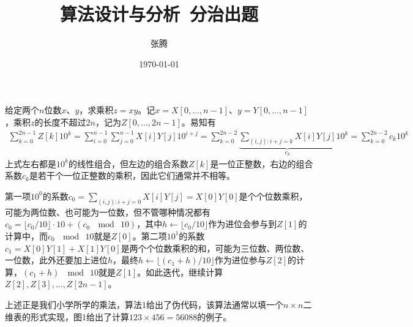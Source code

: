 \documentclass{ctexart}
\begin{document}
\title{算法设计与分析~分治出题}
\author{张腾}
\date{\today}
\maketitle

给定两个$n$位数$x$、$y$，求乘积$z = xy$。记$x = X[0, \ldots, n-1]$、$y = Y[0, \ldots, n-1]$，乘积$z$的长度不超过$2n$，记为$Z[0, \ldots, 2n-1]$。易知有
\begin{align*}
    \sum_{k=0}^{2n-1} Z[k] 10^k = \sum_{i=0}^{n-1} \sum_{j=0}^{n-1} X[i] Y[j] 10^{i+j} = \sum_{k=0}^{2n-2} \underbrace{\sum_{(i,j): i+j=k} X[i] Y[j]}_{c_k} 10^k = \sum_{k=0}^{2n-2} c_k 10^k
\end{align*}
上式左右都是$10^k$的线性组合，但左边的组合系数$Z[k]$是一位正整数，右边的组合系数$c_k$是若干个一位正整数的乘积，因此它们通常并不相等。

第一项$10^0$的系数$c_0 = \sum_{(i,j): i+j=0} X[i] Y[j] = X[0] Y[0]$是个个位数乘积，可能为两位数、也可能为一位数，但不管哪种情况都有$c_0 = \lfloor c_0 / 10 \rfloor \cdot 10 + (c_0 ~ \mod ~ 10)$，其中$h \leftarrow \lfloor c_0 / 10 \rfloor$作为进位会参与到$Z[1]$的计算中，而$c_0 ~ \mod ~ 10$就是$Z[0]$。第二项$10^1$的系数$c_1 = X[0] Y[1] + X[1] Y[0]$是两个个位数乘积的和，可能为三位数、两位数、一位数，此外还要加上进位$h$，最终$h \leftarrow \lfloor (c_1 + h) / 10 \rfloor$作为进位参与$Z[2]$的计算，$(c_1 + h) ~ \mod ~ 10$就是$Z[1]$。如此迭代，继续计算$Z[2], Z[3], \ldots, Z[2n-1]$。

上述正是我们小学所学的乘法，算法1给出了伪代码，该算法通常以填一个$n \times n$二维表的形式实现，图1给出了计算$123 \times 456 = 56088$的例子。
\end{document}
